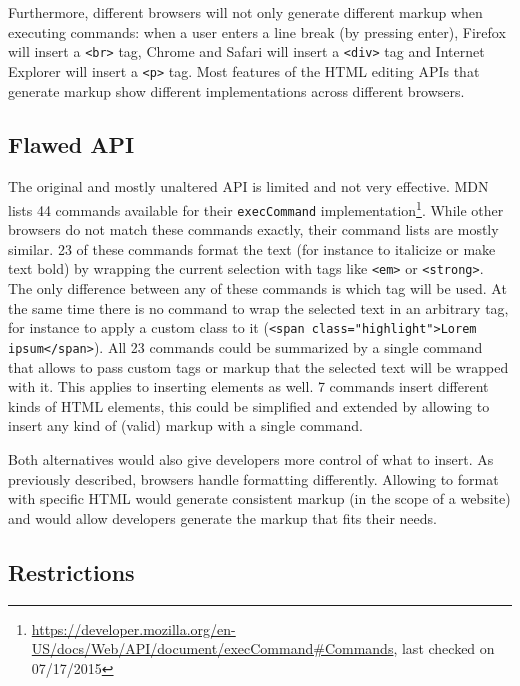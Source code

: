 Furthermore, different browsers will not only generate different markup when executing commands: when a user enters a line break (by pressing enter), Firefox will insert a \texttt{<br>} tag, Chrome and Safari will insert a \texttt{<div>} tag and Internet Explorer will insert a \texttt{<p>} tag. Most features of the HTML editing APIs that generate markup show different implementations across different browsers.


\subsection{Flawed API} 
\label{subsec:flawed_api}

The original and mostly unaltered API is limited and not very effective. MDN lists 44 commands available for their \texttt{execCommand} implementation\footnote{\url{https://developer.mozilla.org/en-US/docs/Web/API/document/execCommand\#Commands}, last checked on 07/17/2015}. While other browsers do not match these commands exactly, their command lists are mostly similar. 23 of these commands format the text (for instance to italicize or make text bold) by wrapping the current selection with tags like \texttt{<em>} or \texttt{<strong>}. The only difference between any of these commands is which tag will be used. At the same time there is no command to wrap the selected text in an arbitrary tag, for instance to apply a custom class to it (\texttt{<span class="highlight">Lorem ipsum</span>}). All 23 commands could be summarized by a single command that allows to pass custom tags or markup that the selected text will be wrapped with it. This applies to inserting elements as well. 7 commands insert different kinds of HTML elements, this could be simplified and extended by allowing to insert any kind of (valid) markup with a single command. 


Both alternatives would also give developers more control of what to insert. As previously described, browsers handle formatting differently. Allowing to format with specific HTML would generate consistent markup (in the scope of a website) and would allow developers generate the markup that fits their needs.


\subsection{Restrictions}

